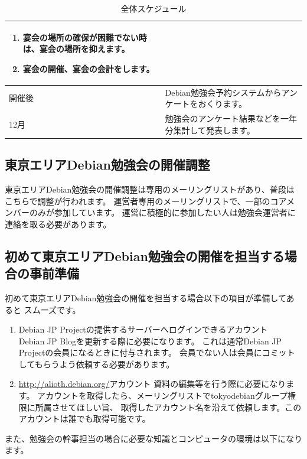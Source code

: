 \documentclass[mingoth,a4paper]{jsarticle}
\begin{document}
\begin{table}[ht]
\begin{center}
\begin{tabular}{|p{12em}|p{31em}|}
\begin{enumerate}
  \item 宴会の場所の確保が困難でない時は、宴会の場所を抑えます。
  \item 宴会の開催、宴会の会計をします。
\end{enumerate} \\
\hline
開催後　& Debian勉強会予約システムからアンケートをおくります。 \\
\hline
12月　& 勉強会のアンケート結果などを一年分集計して発表します。 \\
\hline
\end{tabular}
\caption{全体スケジュール}
\label{tab:meeting-schedule}
\end{center}
\end{table}

\subsection{東京エリアDebian勉強会の開催調整}

東京エリアDebian勉強会の開催調整は専用のメーリングリストがあり、普段はこちらで調整が行われます。
運営者専用のメーリングリストで、一部のコアメンバーのみが参加しています。
運営に積極的に参加したい人は勉強会運営者に連絡を取る必要があります。

\subsection{初めて東京エリアDebian勉強会の開催を担当する場合の事前準備}

初めて東京エリアDebian勉強会の開催を担当する場合以下の項目が準備してあると
スムーズです。

\begin{enumerate}
\item Debian JP Projectの提供するサーバーへログインできるアカウント\\
Debian JP Blogを更新する際に必要になります。
これは通常Debian JP Projectの会員になるときに付与されます。
会員でない人は会員にコミットしてもらうよう依頼する必要があります。

\item \url{http://alioth.debian.org/}アカウント
資料の編集等を行う際に必要になります。
アカウントを取得したら、メーリングリストでtokyodebianグループ権限に所属させてほしい旨、
取得したアカウント名を沿えて依頼します。このアカウントは誰でも取得可能です。

\end{enumerate}

また、勉強会の幹事担当の場合に必要な知識とコンピュータの環境は以下になります。
\end{document}
